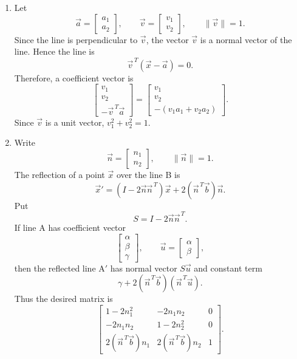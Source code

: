 \documentclass[10pt,a4paper]{article}
\begin{document}
\begin{enumerate}
  \item Let
        \[
          \vec{a}=
          \begin{bmatrix}
            a_1\\a_2
          \end{bmatrix},
          \qquad
          \vec{v}=
          \begin{bmatrix}
            v_1\\v_2
          \end{bmatrix},
          \qquad
          \|\vec{v}\|=1.
        \]
        Since the line is perpendicular to $\vec{v}$, the vector $\vec{v}$ is a normal vector of the line. Hence the line is
        \[
          \vec{v}^{\,T}(\vec{x}-\vec{a})=0.
        \]
        Therefore, a coefficient vector is
        \[
          \boxed{
          \begin{bmatrix}
            v_1\\
            v_2\\
            -\vec{v}^{\,T}\vec{a}
          \end{bmatrix}}
          =
          \boxed{
          \begin{bmatrix}
            v_1\\
            v_2\\
            -(v_1a_1+v_2a_2)
          \end{bmatrix}}.
        \]
        Since $\vec{v}$ is a unit vector, $v_1^2+v_2^2=1$.

  \item Write
        \[
          \vec{n}=
          \begin{bmatrix}
            n_1\\n_2
          \end{bmatrix},
          \qquad
          \|\vec{n}\|=1.
        \]
        The reflection of a point $\vec{x}$ over the line B is
        \[
          \vec{x}'=(I-2\vec{n}\vec{n}^{\,T})\vec{x}
          +2(\vec{n}^{\,T}\vec{b})\vec{n}.
        \]
        Put
        \[
          S=I-2\vec{n}\vec{n}^{\,T}.
        \]
        If line A has coefficient vector
        \[
          \begin{bmatrix}
            \alpha\\\beta\\\gamma
          \end{bmatrix},
          \qquad
          \vec{u}=
          \begin{bmatrix}
            \alpha\\\beta
          \end{bmatrix},
        \]
        then the reflected line A$'$ has normal vector $S\vec{u}$ and constant term
        \[
          \gamma+2(\vec{n}^{\,T}\vec{b})(\vec{n}^{\,T}\vec{u}).
        \]
        Thus the desired matrix is
        \[
          \boxed{
          \begin{bmatrix}
            1-2n_1^2 & -2n_1n_2 & 0\\
            -2n_1n_2 & 1-2n_2^2 & 0\\
            2(\vec{n}^{\,T}\vec{b})n_1 & 2(\vec{n}^{\,T}\vec{b})n_2 & 1
          \end{bmatrix}}.
        \]


\end{enumerate}
\end{document}
